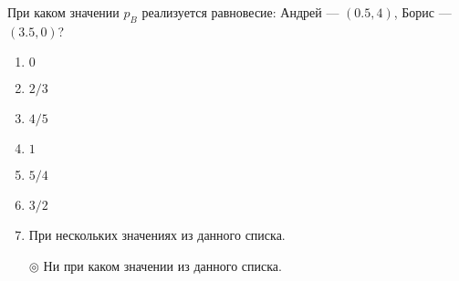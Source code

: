 \task
При каком значении $p_B$ реализуется равновесие: Андрей --- $(0.5,4)$, Борис --- $(3.5,0)$?

\begin{enumerate}[label=$\circ$] %
	\item $0$
	\item $2/3$
	\item $4/5$
	\item $1$
	\item $5/4$
	\item $3/2$
	\item При нескольких значениях из данного списка.
	\item[$\circledcirc$] Ни при каком значении из данного списка.
\end{enumerate}